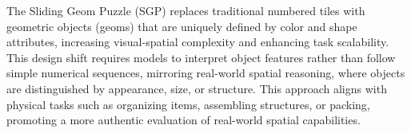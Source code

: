 The Sliding Geom Puzzle (SGP) replaces traditional numbered tiles with geometric objects (geoms) that are uniquely defined by color and shape attributes, increasing visual-spatial complexity and enhancing task scalability. This design shift requires models to interpret object features rather than follow simple numerical sequences, mirroring real-world spatial reasoning, where objects are distinguished by appearance, size, or structure. This approach aligns with physical tasks such as organizing items, assembling structures, or packing, promoting a more authentic evaluation of real-world spatial capabilities.

